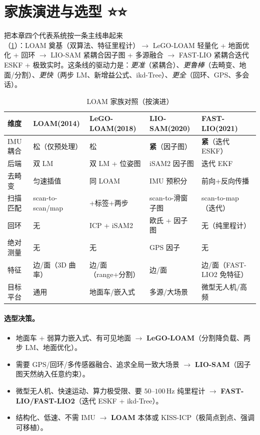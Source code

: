 \section{家族演进与选型 ⭐⭐}
\label{sec:lidar-family}

把本章四个代表系统按一条主线串起来（\cref{tab:lidar-family}）：LOAM 奠基（双算法、特征里程计）$\to$ LeGO-LOAM 轻量化 + 地面优化 + 回环 $\to$ LIO-SAM 紧耦合因子图 + 多源融合 $\to$ FAST-LIO 紧耦合迭代 ESKF + 极致实时。这条线的驱动力是：\emph{更准}（紧耦合）、\emph{更鲁棒}（去畸变、地面/分割）、\emph{更快}（两步 LM、新增益公式、ikd-Tree）、\emph{更全}（回环、GPS、多会话）。

\begin{table}[H]\centering\small
\caption{LOAM 家族对照（按演进）}
\label{tab:lidar-family}
\begin{tabular}{lllll}
\toprule
维度 & LOAM(2014) & LeGO-LOAM(2018) & LIO-SAM(2020) & FAST-LIO(2021) \\
\midrule
IMU 耦合 & 松（仅预处理） & 松 & \textbf{紧}（因子图） & \textbf{紧}（迭代 ESKF） \\
后端 & 双 LM & 双 LM + 位姿图 & iSAM2 因子图 & 迭代 EKF \\
去畸变 & 匀速插值 & 同 LOAM & IMU 预积分 & 前向+反向传播 \\
扫描匹配 & scan-to-scan/map & +标签+两步 & scan-to-滑窗子图 & scan-to-map（迭代） \\
回环 & 无 & ICP + iSAM2 & 欧氏 + 因子图 & 无（纯里程计） \\
绝对测量 & 无 & 无 & GPS 因子 & 无 \\
特征 & 边/面（3D 曲率） & 边/面（range+分割） & 边/面 & 边/面（FAST-LIO2 免特征） \\
目标平台 & 通用 & 地面车/嵌入式 & 多源/大场景 & 微型无人机/高频 \\
\bottomrule
\end{tabular}
\end{table}

\paragraph{选型决策。}
\begin{itemize}
  \item 地面车 + 弱算力嵌入式、有可见地面 $\to$ \textbf{LeGO-LOAM}（分割降负载、两步 LM、地面优化）。
  \item 需要 GPS/回环/多传感器融合、追求全局一致大场景 $\to$ \textbf{LIO-SAM}（因子图天然纳入任意约束）。
  \item 微型无人机、快速运动、算力极受限、要 $50$–$100$\,Hz 纯里程计 $\to$ \textbf{FAST-LIO/FAST-LIO2}（迭代 ESKF + ikd-Tree）。
  \item 结构化、低速、不需 IMU $\to$ \textbf{LOAM} 本体或 KISS-ICP\cite{vizzo2023kissicp}（极简点到点、强调可移植）。
\end{itemize}

